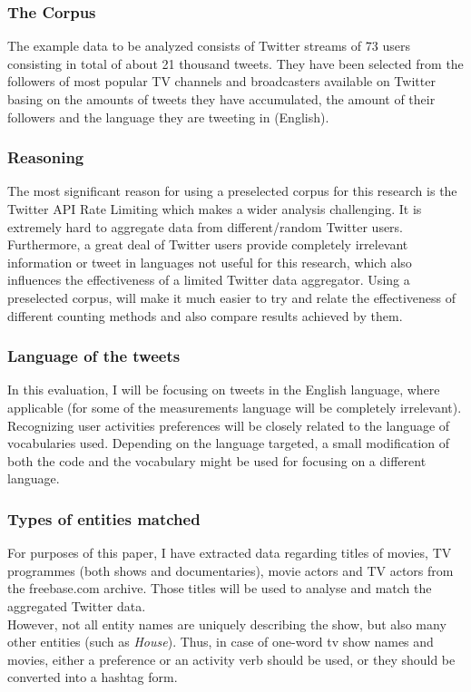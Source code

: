 \documentclass{article}
\begin{document}
\subsubsection{The Corpus}
The example data to be analyzed consists of Twitter streams of 73 users
consisting in total of about 21 thousand tweets. They have been selected from the followers of most popular TV channels and broadcasters available on Twitter basing on the amounts of tweets they have accumulated, the amount of their followers and the language they are tweeting in (English).

\subsubsection{Reasoning}
The most significant reason for using a preselected corpus for this research is
the Twitter API Rate Limiting which makes a wider analysis challenging. It is
extremely hard to aggregate data from different/random Twitter users.
Furthermore, a great deal of Twitter users provide completely irrelevant
information or tweet in languages not useful for this research, which also
influences the effectiveness of a limited Twitter data aggregator. Using a preselected corpus, will make it much easier to try and relate the effectiveness of different counting methods and also compare results achieved by them.

\subsubsection{Language of the tweets}
In this evaluation, I will be focusing on tweets in the English language, where
applicable (for some of the measurements language will be completely
    irrelevant). \\ Recognizing user activities preferences will be closely
related to the language of vocabularies used. Depending on the language
targeted, a small modification of both the code and the vocabulary might be used
for focusing on a different language.

\subsubsection{Types of entities matched}
For purposes of this paper, I have extracted data regarding titles of movies, TV
programmes (both shows and documentaries), movie actors and TV actors from the
freebase.com archive. Those titles will be used to analyse and match the
aggregated Twitter data.
\\ However, not all entity names are uniquely describing the show, but also many
other entities (such as \textit{House}). Thus, in case of one-word tv show names and
movies, either a preference or an activity verb should be used, or they should
be converted into a hashtag form.
\end{document}
